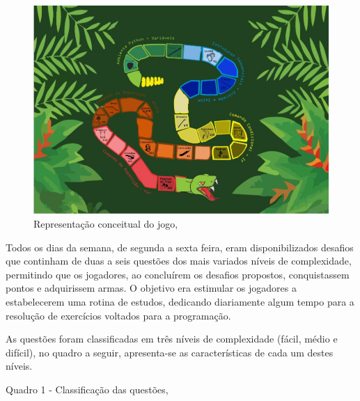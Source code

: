 \begin{figure}[h]
	\centering
	\includegraphics[keepaspectratio=true,scale=0.35]{figuras/desafioSerpente.png}
	\caption{Representação conceitual do jogo, }
	\label{figura1}
\end{figure}

Todos os dias da semana, de segunda a sexta feira, eram disponibilizados desafios que continham de duas a seis
questões dos mais variados níveis de complexidade, permitindo que os jogadores, ao concluírem os desafios propostos, 
conquistassem pontos e adquirissem armas. O objetivo era estimular os jogadores a estabelecerem uma rotina de estudos,
dedicando diariamente algum tempo para a resolução de exercícios voltados para a programação.

As questões foram classificadas em três níveis de complexidade (fácil, médio e difícil), no quadro a seguir, apresenta-se
as características de cada um destes níveis.

\begin{table}[h]
	\centering
	\small{Quadro 1 - Classificação das questões, } 
\end{table}

